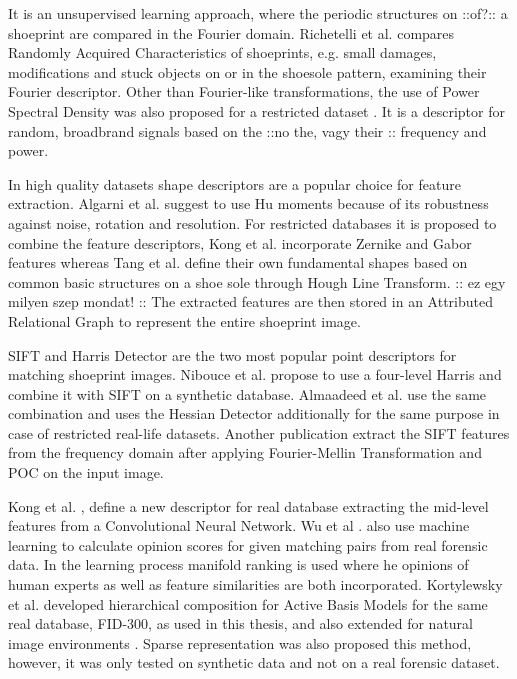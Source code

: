 \documentclass[draft,final]{vutinfth} %
\begin{document}
It is an unsupervised learning approach, where the periodic structures on ::of?:: a shoeprint are compared in the Fourier domain.
Richetelli et al. \cite{richetelli2017quantitative} compares Randomly Acquired Characteristics of shoeprints, e.g. small damages, modifications and stuck objects on or in the shoesole pattern, examining their Fourier descriptor.
Other than Fourier-like transformations, the use of Power Spectral Density was also proposed for a restricted dataset \cite{dardi2009texture}.
It is a descriptor for random, broadbrand signals based on the ::no the, vagy their :: frequency and power.
\par
In high quality datasets shape descriptors are a popular choice for feature extraction.
Algarni et al. \cite{algarni2008novel} suggest to use Hu moments because of its robustness against noise, rotation and resolution.
For restricted databases it is proposed to combine the feature descriptors, Kong et al. \cite{kong2014novel} incorporate Zernike and Gabor features whereas Tang et al. \cite{tang2010footwear} define their own fundamental shapes based on common basic structures on a shoe sole through Hough Line Transform. :: ez egy milyen szep mondat! ::
The extracted features are then stored in an Attributed Relational Graph to represent the entire shoeprint image.
\par
SIFT and Harris Detector are the two most popular point descriptors for matching shoeprint images.
Nibouce et al. \cite{nibouche2009rotation} propose to use a four-level Harris and combine it with SIFT on a synthetic database.
Almaadeed et al. \cite{almaadeed2015partial} use the same combination and uses the Hessian Detector additionally for the same purpose in case of restricted real-life datasets.
Another publication \cite{richetelli2017classification} extract the SIFT features from the frequency domain after applying Fourier-Mellin Transformation and POC on the input image.
\par
Kong et al. \cite{kong2017cross}, \cite{kong2019cross} define a new descriptor for real database extracting the mid-level features from a Convolutional Neural Network.
Wu et al .\cite{wu2019losgsr} also use machine learning to calculate opinion scores for given matching pairs from real forensic data.
In the learning process manifold ranking is used where he opinions of human experts as well as feature similarities are both incorporated.
Kortylewsky et al. \cite{kortylewski2016probabilistic} developed hierarchical composition for Active Basis Models for the same real database, FID-300, as used in this thesis, and also extended for natural image environments \cite{kortylewski2019greedy}.
Sparse representation was also proposed \cite{alizadeh2017automatic} this method, however, it was only tested on synthetic data and not on a real forensic dataset.
\end{document}
